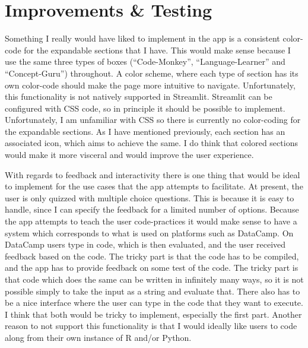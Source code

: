 \documentclass[12pt]{article}
\begin{document}
\section{Improvements \& Testing}
Something I really would have liked to implement in the app is a consistent
color-code for the expandable sections that I have. This would make sense
because I use the same three types of boxes (“Code-Monkey”, “Language-Learner” and “Concept-Guru”)
throughout. A color scheme, where each type of section has its own color-code
should make the page more intuitive to navigate. Unfortunately, this functionality
is not natively supported in Streamlit. Streamlit can be configured with CSS code,
so in principle it should be possible to implement. Unfortunately, I am unfamiliar
with CSS so there is currently no color-coding for the expandable sections.
As I have mentioned previously, each section has an associated icon,
which aims to achieve the same. I do think that colored sections would make
it more visceral and would improve the user experience.

With regards to feedback and interactivity there is one thing that would be ideal
to implement for the use cases that the app attempts to facilitate. At present,
the user is only quizzed with multiple choice questions. This is because it is easy
to handle, since I can specify the feedback for a limited number of options.
Because the app attempts to teach the user code-practices it would make sense to
have a system which corresponds to what is used on platforms such as DataCamp.
On DataCamp users type in code, which is then evaluated, and the user received feedback
based on the code. The tricky part is that the code has to be compiled,
and the app has to provide feedback on some test of the code. The tricky part
is that code which does the same can be written in infinitely many ways,
so it is not possible simply to take the input as a string and evaluate that.
There also has to be a nice interface where the user can type in the code that
they want to execute. I think that both would be tricky to implement, especially the
first part. Another reason to not support this functionality is that I would ideally
like users to code along from their own instance of R and/or Python.
\end{document}
